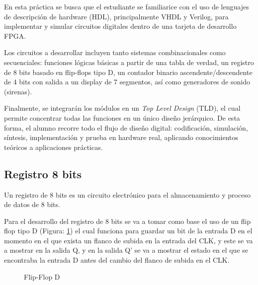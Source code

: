 
En esta práctica se busca que el estudiante se familiarice con el uso de lenguajes de descripción de hardware (HDL), principalmente VHDL y Verilog, para implementar y simular circuitos digitales dentro de una tarjeta de desarrollo FPGA. 

Los circuitos a desarrollar incluyen tanto sistemas combinacionales como secuenciales: funciones lógicas básicas a partir de una tabla de verdad, un registro de 8 bits basado en flip-flops tipo D, un contador binario ascendente/descendente de 4 bits con salida a un display de 7 segmentos, así como generadores de sonido (sirenas). 

Finalmente, se integrarán los módulos en un \textit{Top Level Design} (TLD), el cual permite concentrar todas las funciones en un único diseño jerárquico. De esta forma, el alumno recorre todo el flujo de diseño digital: codificación, simulación, síntesis, implementación y prueba en hardware real, aplicando conocimientos teóricos a aplicaciones prácticas.

\subsection*{Registro 8 bits}

Un registro de 8 bits es un circuito electrónico para el almacenamiento y proceso de datos de 8 bits.

Para el desarrollo del registro de 8 bits se va a tomar como base el uso de un flip flop tipo D (Figura: \ref{fig:FF-D}) el cual funciona para guardar un bit de la entrada D en el momento en el que exista un flanco de subida en la entrada del CLK, y este se va a mostrar en la salida Q, y en la salida Q' se va a mostrar el estado en el que se encontraba la entrada D antes del cambio del flanco de subida en el CLK. 

\begin{figure}[H]
    \centering
    \caption{Flip-Flop D}
    \label{fig:FF-D}

\end{figure}

